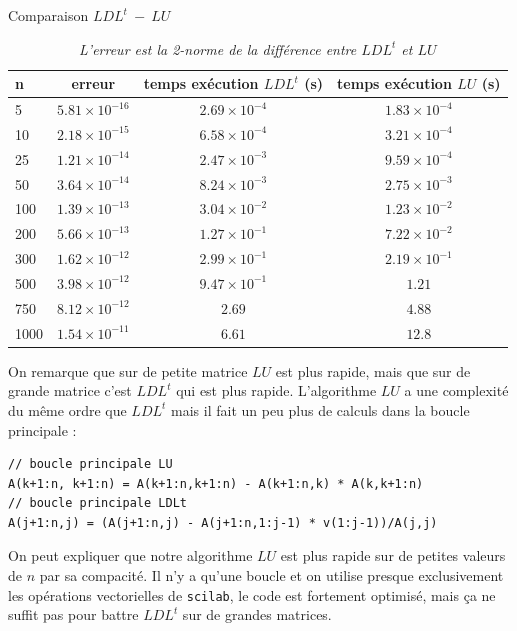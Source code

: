 \documentclass{article}
\begin{document}
\begin{table}[H]
\centering
\renewcommand*\arraystretch{1.3}
\caption{Comparaison \(LDL^t\ -\ LU\)}
\begin{tabular}{|l|c|c|c|}
  \hline
  n & erreur & temps exécution \(LDL^t\) (s) & temps exécution \(LU\) (s) \\
  \hline
	5	&	\(5.81 \times 10^{-16}\)	&	\(2.69 \times 10^{-4}\)	&	\(1.83 \times 10^{-4}\) \\
	10	&	\(2.18 \times 10^{-15}\)	&	\(6.58 \times 10^{-4}\)	&	\(3.21 \times 10^{-4}\) \\
	25	&	\(1.21 \times 10^{-14}\)	&	\(2.47 \times 10^{-3}\)	&	\(9.59 \times 10^{-4}\) \\
	50	&	\(3.64 \times 10^{-14}\)	&	\(8.24 \times 10^{-3}\)	&	\(2.75 \times 10^{-3}\) \\
	100	&	\(1.39 \times 10^{-13}\)	&	\(3.04 \times 10^{-2}\)	&	\(1.23 \times 10^{-2}\) \\
	200	&	\(5.66 \times 10^{-13}\)	&	\(1.27 \times 10^{-1}\)	&	\(7.22 \times 10^{-2}\) \\
	300	&	\(1.62 \times 10^{-12}\)	&	\(2.99 \times 10^{-1}\)	&	\(2.19 \times 10^{-1}\) \\
	500	&	\(3.98 \times 10^{-12}\)	&	\(9.47 \times 10^{-1}\)	&	\(1.21\) \\
	750	&	\(8.12 \times 10^{-12}\)	&	\(2.69\)				&	\(4.88\) \\
	1000 &	\(1.54 \times 10^{-11}\)	&	\(6.61\) 				&	\(12.8\) \\
  \hline
\end{tabular}
\caption*{\textit{L'erreur est la 2-norme de la différence entre \(LDL^t\) et \(LU\)}}
\end{table}

On remarque que sur de petite matrice \(LU\) est plus rapide, mais que sur de grande matrice c'est \(LDL^t\) qui est plus rapide. L'algorithme \(LU\) a une complexité du même ordre que \(LDL^t\) mais il fait un peu plus de calculs dans la boucle principale :  \begin{verbatim}
// boucle principale LU
A(k+1:n, k+1:n) = A(k+1:n,k+1:n) - A(k+1:n,k) * A(k,k+1:n)
// boucle principale LDLt
A(j+1:n,j) = (A(j+1:n,j) - A(j+1:n,1:j-1) * v(1:j-1))/A(j,j)
\end{verbatim}
On peut expliquer que notre algorithme \(LU\) est plus rapide sur de petites valeurs de \(n\) par sa compacité. Il n'y a qu'une boucle et on utilise presque exclusivement les opérations vectorielles de \texttt{scilab}, le code est fortement optimisé, mais ça ne suffit pas pour battre \(LDL^t\) sur de grandes matrices.
\end{document}
